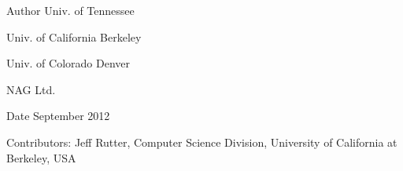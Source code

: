 \begin{DoxyAuthor}{Author}
Univ. of Tennessee 

Univ. of California Berkeley 

Univ. of Colorado Denver 

N\+A\+G Ltd. 
\end{DoxyAuthor}
\begin{DoxyDate}{Date}
September 2012 
\end{DoxyDate}
\begin{DoxyParagraph}{Contributors\+: }
Jeff Rutter, Computer Science Division, University of California at Berkeley, U\+S\+A 
\end{DoxyParagraph}
